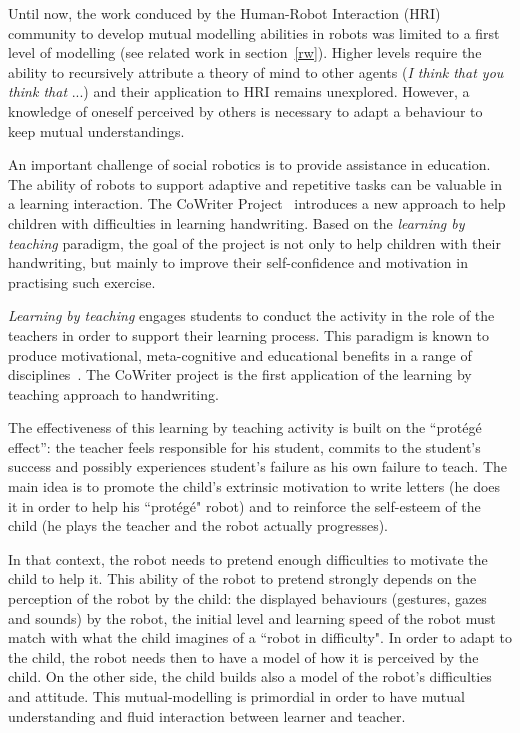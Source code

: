 \documentclass[conference]{IEEEtran}
\begin{document}
Until now, the work conduced by the Human-Robot Interaction (HRI) community to develop mutual modelling abilities in robots was limited to a first level of modelling (see related work in section~\ref{rw}). Higher levels require the ability to recursively attribute a theory of mind to other agents (\textit{I think that you think that} ...) and their application to HRI remains unexplored. However, a knowledge of oneself perceived by others is necessary to adapt a behaviour to keep mutual understandings. 


An important challenge of social robotics is to provide assistance in education. 
The ability of robots to support adaptive and repetitive tasks can be valuable in a learning interaction.
The CoWriter Project~\cite{Hood,jacq2016building} introduces a new approach to help children with difficulties in learning handwriting. 
Based on the \emph{learning by teaching} paradigm, the goal of the project is not only to help children with their handwriting, but mainly to improve their self-confidence and motivation in practising such exercise.

\emph{Learning by teaching} engages students to conduct the activity in the role of the teachers in order to support their learning process. 
This  paradigm is known to produce motivational, meta-cognitive and educational benefits in a range of disciplines~\cite{Rohrbeck2003}. 
The CoWriter project is the first application of the learning by teaching approach to handwriting.

The effectiveness of this learning by teaching activity is built on the ``prot\'eg\'e effect'': the teacher feels responsible for his student, commits to the student's success and possibly experiences student's failure as his own failure to teach. 
The main idea is to promote the child's extrinsic motivation to write letters (he does it in order to help his ``prot\'eg\'e" robot) and to reinforce the self-esteem of the child (he plays the teacher and the robot actually progresses).

In that context, the robot needs to pretend enough difficulties to motivate the child to help it. 
This ability of the robot to pretend strongly depends on the perception of the robot by the child: the displayed behaviours (gestures, gazes and sounds) by the robot, the initial level and learning speed of the robot must match with what the child imagines of a ``robot in difficulty".
In order to adapt to the child, the robot needs then to have a model of how it is perceived by the child. On the other side, the child builds also a model of the robot's difficulties and attitude. 
This mutual-modelling is primordial in order to have mutual understanding and fluid interaction between learner and teacher. 
\end{document}
